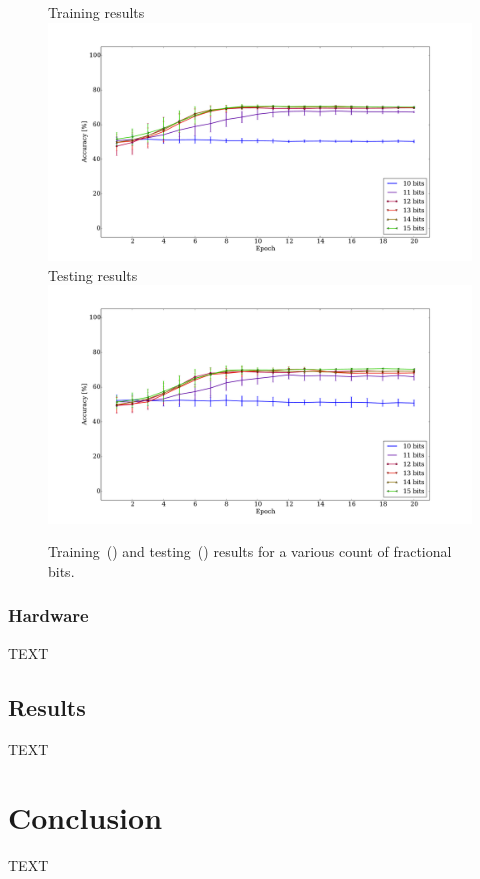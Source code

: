 \documentclass[10pt,journal]{IEEEtran}
\begin{document}
				\begin{figure}[t!]
					\captionsetup[subfigure]{position=b}
					\centering
					\hfill
					\subcaptionbox
					{
						Training results
						\label{fig:sw_fractional_bits:training}
					}
					{\includegraphics[width=0.49\linewidth]{sw_fractional_bits_training}}
					\hfill
					\subcaptionbox
					{
						Testing results
						\label{fig:sw_fractional_bits:testing}
					}
					{\includegraphics[width=0.49\linewidth]{sw_fractional_bits_testing}}
					\hfill
					\caption{Training~() and testing~() results for a various count of fractional bits.}
					\label{fig:fractional_bits}
				\end{figure}
		
		\subsubsection{Hardware}
			TEXT
	
	\subsection{Results}
		TEXT
	
	\section{Conclusion}
		TEXT
	
	
		
	
\end{document}
